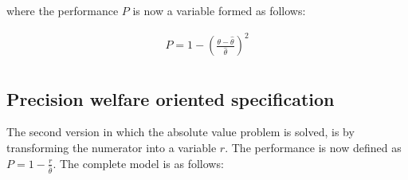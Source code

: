 \documentclass[a4paper,fleqn]{cas-dc}
\begin{document}
where the performance $P$ is now a variable formed as follows:

\begin{equation}
\begin{array}{rrclcl}
\displaystyle P = 1- (\frac{{\theta - \hat{\theta}}}{\hat{\theta}})^2 \\
\end{array}
\end{equation}

\subsection{Precision welfare oriented specification}\label{subsec:PW}

The second version in which the absolute value problem is solved, is by transforming the numerator into a variable $r$.  The performance is now defined as $P= 1 - \frac{r}{\hat{\theta}}$. The complete model is as follows:
\end{document}
